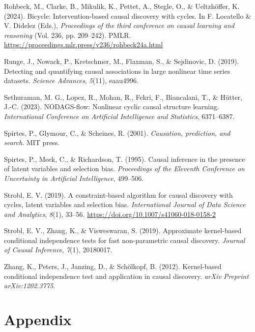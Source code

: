 \documentclass[
]{article}
\newlength{\cslhangindent}
\newenvironment{CSLReferences}[2] %
 {\begin{list}{}{%
  \setlength{\itemindent}{0pt}
  \setlength{\leftmargin}{0pt}
  \setlength{\parsep}{0pt}
  \ifodd #1
   \setlength{\leftmargin}{\cslhangindent}
   \setlength{\itemindent}{-1\cslhangindent}
  \fi
  \setlength{\itemsep}{#2\baselineskip}}}
 {\end{list}}
\begin{document}
\begin{CSLReferences}{1}{0}
Rohbeck, M., Clarke, B., Mikulik, K., Pettet, A., Stegle, O., \&
Ueltzhöffer, K. (2024). Bicycle: Intervention-based causal discovery
with cycles. In F. Locatello \& V. Didelez (Eds.), \emph{Proceedings of
the third conference on causal learning and reasoning} (Vol. 236, pp.
209--242). PMLR.
\url{https://proceedings.mlr.press/v236/rohbeck24a.html}

Runge, J., Nowack, P., Kretschmer, M., Flaxman, S., \& Sejdinovic, D.
(2019). Detecting and quantifying causal associations in large nonlinear
time series datasets. \emph{Science Advances}, \emph{5}(11), eaau4996.

Sethuraman, M. G., Lopez, R., Mohan, R., Fekri, F., Biancalani, T., \&
Hütter, J.-C. (2023). NODAGS-flow: Nonlinear cyclic causal structure
learning. \emph{International Conference on Artificial Intelligence and
Statistics}, 6371--6387.

Spirtes, P., Glymour, C., \& Scheines, R. (2001). \emph{Causation,
prediction, and search}. MIT press.

Spirtes, P., Meek, C., \& Richardson, T. (1995). Causal inference in the
presence of latent variables and selection bias. \emph{Proceedings of
the {Eleventh} Conference on {Uncertainty} in Artificial Intelligence},
499--506.

Strobl, E. V. (2019). A constraint-based algorithm for causal discovery
with cycles, latent variables and selection bias. \emph{International
Journal of Data Science and Analytics}, \emph{8}(1), 33--56.
\url{https://doi.org/10.1007/s41060-018-0158-2}

Strobl, E. V., Zhang, K., \& Visweswaran, S. (2019). Approximate
kernel-based conditional independence tests for fast non-parametric
causal discovery. \emph{Journal of Causal Inference}, \emph{7}(1),
20180017.

Zhang, K., Peters, J., Janzing, D., \& Schölkopf, B. (2012).
Kernel-based conditional independence test and application in causal
discovery. \emph{arXiv Preprint arXiv:1202.3775}.

\end{CSLReferences}

\section{Appendix}\label{sec-appendix}
\end{document}
